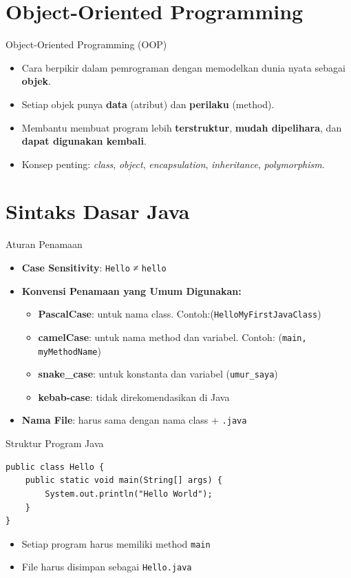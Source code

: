 \documentclass{beamer}
\begin{document}
\section{Object-Oriented Programming}
\begin{frame}{Object-Oriented Programming (OOP)}
  \begin{itemize}
    \item Cara berpikir dalam pemrograman dengan memodelkan dunia nyata sebagai \textbf{objek}.
    \item Setiap objek punya \textbf{data} (atribut) dan \textbf{perilaku} (method).
    \item Membantu membuat program lebih \textbf{terstruktur}, \textbf{mudah dipelihara}, dan \textbf{dapat digunakan kembali}.
    \item Konsep penting: \textit{class}, \textit{object}, \textit{encapsulation}, \textit{inheritance}, \textit{polymorphism}.
  \end{itemize}
\end{frame}

\section{Sintaks Dasar Java}

\begin{frame}[fragile]{Aturan Penamaan}
  \begin{itemize}
    \item \textbf{Case Sensitivity}: \texttt{Hello} ≠ \texttt{hello}
    \item \textbf{Konvensi Penamaan yang Umum Digunakan:}
    \begin{itemize}
      \item \textbf{PascalCase}: untuk nama class. Contoh:(\texttt{HelloMyFirstJavaClass})
      \item \textbf{camelCase}: untuk nama method dan variabel. Contoh: (\texttt{main, myMethodName})
      \item \textbf{snake\_case}: untuk konstanta dan variabel (\texttt{umur\_saya})
      \item \textbf{kebab-case}: tidak direkomendasikan di Java
    \end{itemize}
    \item \textbf{Nama File}: harus sama dengan nama class + \texttt{.java}
  \end{itemize}
\end{frame}

\begin{frame}[fragile]{Struktur Program Java}
\begin{lstlisting}
public class Hello {
    public static void main(String[] args) {
        System.out.println("Hello World");
    }
}
\end{lstlisting}
  \begin{itemize}
    \item Setiap program harus memiliki method \texttt{main}
    \item File harus disimpan sebagai \texttt{Hello.java}
  \end{itemize}
\end{frame}
\end{document}

